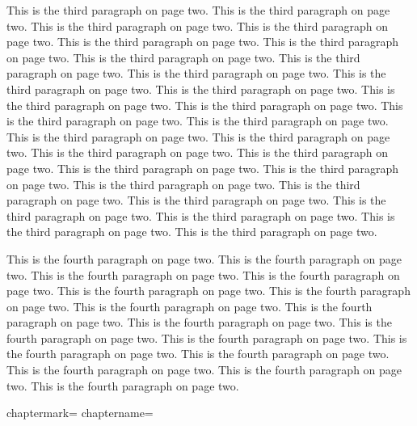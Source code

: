 \documentclass[11pt,a4paper,english]{book}
\begin{document}
This is the third paragraph on page two.
This is the third paragraph on page two.
This is the third paragraph on page two.
This is the third paragraph on page two.
This is the third paragraph on page two.
This is the third paragraph on page two.
This is the third paragraph on page two.
This is the third paragraph on page two.
This is the third paragraph on page two.
This is the third paragraph on page two.
This is the third paragraph on page two.
This is the third paragraph on page two.
This is the third paragraph on page two.
This is the third paragraph on page two.
This is the third paragraph on page two.
This is the third paragraph on page two.
This is the third paragraph on page two.
This is the third paragraph on page two.
This is the third paragraph on page two.
This is the third paragraph on page two.
This is the third paragraph on page two.
This is the third paragraph on page two.
This is the third paragraph on page two.
This is the third paragraph on page two.
This is the third paragraph on page two.
This is the third paragraph on page two.
This is the third paragraph on page two.
This is the third paragraph on page two.

This is the fourth paragraph on page two.
This is the fourth paragraph on page two.
This is the fourth paragraph on page two.
This is the fourth paragraph on page two.
This is the fourth paragraph on page two.
This is the fourth paragraph on page two.
This is the fourth paragraph on page two.
This is the fourth paragraph on page two.
This is the fourth paragraph on page two.
This is the fourth paragraph on page two.
This is the fourth paragraph on page two.
This is the fourth paragraph on page two.
This is the fourth paragraph on page two.
This is the fourth paragraph on page two.
This is the fourth paragraph on page two.
This is the fourth paragraph on page two.
\chaptername\par

chaptermark=\chaptermark \quad
chaptername=\chaptername\par
\end{document}
